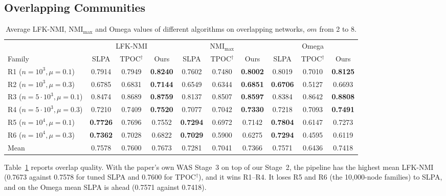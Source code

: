 \documentclass[conference]{IEEEtran}
\begin{document}
\subsection{Overlapping Communities}
\begin{table}[t]
\centering
\caption{Average LFK-NMI, $\mathrm{NMI}_{\max}$ and Omega values of different algorithms on overlapping networks, $om$ from 2 to 8.}
\label{tab:ov}
\scriptsize
\begin{tabular}{lccc|ccc|ccc}
\toprule
 & \multicolumn{3}{c|}{LFK-NMI} & \multicolumn{3}{c|}{$\mathrm{NMI}_{\max}$} & \multicolumn{3}{c}{Omega} \\
Family & SLPA & TPOC$^{\dagger}$ & Ours & SLPA & TPOC$^{\dagger}$ & Ours & SLPA & TPOC$^{\dagger}$ & Ours \\
\midrule
R1 ($n{=}10^3,\mu{=}0.1$) & 0.7914 & 0.7949 & \textbf{0.8240} & 0.7602 & 0.7480 & \textbf{0.8002} & 0.8019 & 0.7010 & \textbf{0.8125} \\
R2 ($n{=}10^3,\mu{=}0.3$) & 0.6785 & 0.6831 & \textbf{0.7144} & 0.6549 & 0.6344 & \textbf{0.6851} & \textbf{0.6706} & 0.5127 & 0.6693 \\
R3 ($n{=}5{\cdot}10^3,\mu{=}0.1$) & 0.8474 & 0.8689 & \textbf{0.8759} & 0.8137 & 0.8507 & \textbf{0.8597} & 0.8384 & 0.8642 & \textbf{0.8808} \\
R4 ($n{=}5{\cdot}10^3,\mu{=}0.3$) & 0.7210 & 0.7409 & \textbf{0.7520} & 0.7077 & 0.7042 & \textbf{0.7330} & 0.7218 & 0.7093 & \textbf{0.7491} \\
R5 ($n{=}10^4,\mu{=}0.1$) & \textbf{0.7726} & 0.7696 & 0.7552 & \textbf{0.7294} & 0.6972 & 0.7142 & \textbf{0.7804} & 0.6147 & 0.7273 \\
R6 ($n{=}10^4,\mu{=}0.3$) & \textbf{0.7362} & 0.7028 & 0.6822 & \textbf{0.7029} & 0.5900 & 0.6275 & \textbf{0.7294} & 0.4595 & 0.6119 \\
\midrule
Mean & 0.7578 & 0.7600 & 0.7673 & 0.7281 & 0.7041 & 0.7366 & 0.7571 & 0.6436 & 0.7418 \\
\bottomrule
\end{tabular}
\end{table}
Table~\ref{tab:ov} reports overlap quality. With the paper's own WAS Stage~3 on top of our Stage~2, the pipeline has the highest mean LFK-NMI (0.7673 against 0.7578 for tuned SLPA and 0.7600 for TPOC$^{\dagger}$), and it wins R1--R4. It loses R5 and R6 (the 10{,}000-node families) to SLPA, and on the Omega mean SLPA is ahead (0.7571 against 0.7418).
\end{document}
